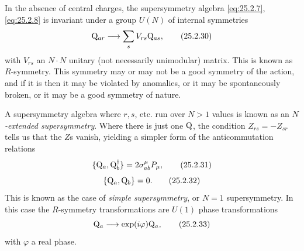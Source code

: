 In the absence of central charges, the supersymmetry algebra
\eqref{eq:25.2.7}, \eqref{eq:25.2.8} is invariant under a group \(U(N)\)
of internal symmetries
\begin{equation}
\mathrm{Q}_{ar}\longrightarrow\sum_sV_{rs}\mathrm{Q}_{as},
\tag{25.2.30}\label{eq:25.2.30}
\end{equation}
with \(V_{rs}\) an \(N\cdot N\) unitary (not necessarily unimodular)
matrix. This is known as \(R\)-symmetry. This symmetry may or may not be
a good symmetry of the action, and if it is then it may be violated by
anomalies, or it may be spontaneously broken, or it may be a good symmetry
of nature.

A supersymmetry algebra where \(r,s\), etc. run over \(N>1\) values is
known as an \emph{\(N\)-extended supersymmetry}. Where there is just one
\(\mathrm{Q}\), the condition \(Z_{rs}=-Z_{sr}\) tells us that the \(Z\)s
vanish, yielding a simpler form of the anticommutation relations
\begin{equation}
\{\mathrm{Q}_a,\mathrm{Q}_b^\dagger\}=2\sigma^\mu_{ab}P_\mu,
\tag{25.2.31}\label{eq:25.2.31}
\end{equation}
\begin{equation}
\{\mathrm{Q}_a,\mathrm{Q}_b\}=0.
\tag{25.2.32}\label{eq:25.2.32}
\end{equation}
This is known as the case of \emph{simple supersymmetry}, or \(N=1\)
supersymmetry. In this case the \(R\)-symmetry transformations are \(U(1)\)
phase transformations
\begin{equation}
\mathrm{Q}_a\longrightarrow\exp(i\varphi)\mathrm{Q}_a,
\tag{25.2.33}\label{eq:25.2.33}
\end{equation}
with \(\varphi\) a real phase.

